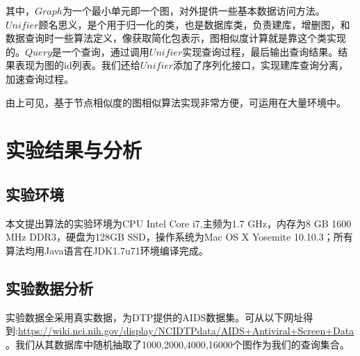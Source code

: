 \documentclass{XDBAthesis}
\begin{document}
其中，$Graph$为一个最小单元即一个图，对外提供一些基本数据访问方法。$Unifier$顾名思义，是个用于归一化的类，也是数据库类，负责建库，增删图，和数据查询时一些算法定义，像获取简化包表示，图相似度计算就是靠这个类实现的。$Query$是一个查询，通过调用$Unifier$实现查询过程，最后输出查询结果。结果表现为图的id列表。我们还给$Unifier$添加了序列化接口，实现建库查询分离，加速查询过程。

由上可见，基于节点相似度的图相似算法实现非常方便，可运用在大量环境中。


\section{实验结果与分析}
\subsection{实验环境}
本文提出算法的实验环境为CPU Intel Core i7,主频为1.7 GHz，内存为8 GB 1600 MHz DDR3，硬盘为128GB SSD，操作系统为Mac OS X Yosemite 10.10.3；所有算法均用Java语言在JDK1.7u71环境编译完成。
\subsection{实验数据分析}
实验数据全采用真实数据，为DTP提供的AIDS数据集。可从以下网址得到:\url{https://wiki.nci.nih.gov/display/NCIDTPdata/AIDS+Antiviral+Screen+Data}。我们从其数据库中随机抽取了1000,2000,4000,16000个图作为我们的查询集合。
\ifx\allfiles\undefined
%

\end{document}
